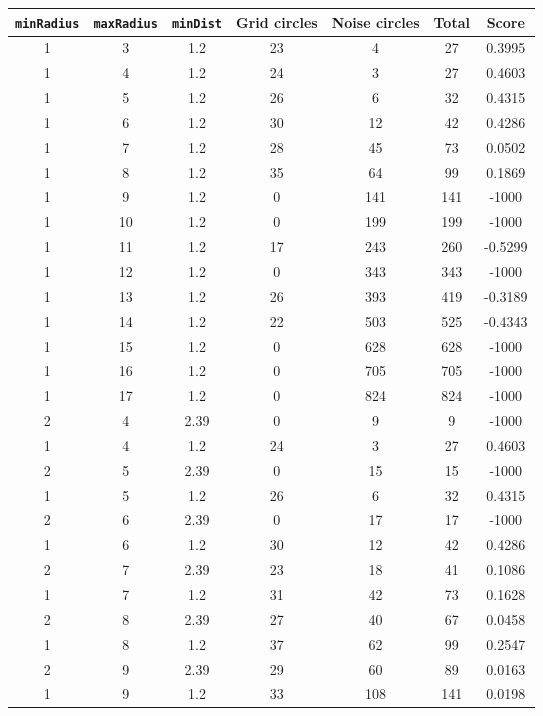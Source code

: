 \documentclass[letterpaper, 12pt]{article}
\begin{document}
\begin{longtable}{|c|c|c|c|c|c|c|}
\hline
\textbf{\texttt{minRadius}} & \textbf{\texttt{maxRadius}} & \textbf{\texttt{minDist}} & \textbf{Grid circles} & \textbf{Noise circles} & \textbf{Total} & \textbf{Score} \\
\hline
1 & 3 & 1.2 & 23 & 4 & 27 & 0.3995 \\
\hline
1 & 4 & 1.2 & 24 & 3 & 27 & 0.4603 \\
\hline
1 & 5 & 1.2 & 26 & 6 & 32 & 0.4315 \\
\hline
1 & 6 & 1.2 & 30 & 12 & 42 & 0.4286 \\
\hline
1 & 7 & 1.2 & 28 & 45 & 73 & 0.0502 \\
\hline
1 & 8 & 1.2 & 35 & 64 & 99 & 0.1869 \\
\hline
1 & 9 & 1.2 & 0 & 141 & 141 & -1000 \\
\hline
1 & 10 & 1.2 & 0 & 199 & 199 & -1000 \\
\hline
1 & 11 & 1.2 & 17 & 243 & 260 & -0.5299 \\
\hline
1 & 12 & 1.2 & 0 & 343 & 343 & -1000 \\
\hline
1 & 13 & 1.2 & 26 & 393 & 419 & -0.3189 \\
\hline
1 & 14 & 1.2 & 22 & 503 & 525 & -0.4343 \\
\hline
1 & 15 & 1.2 & 0 & 628 & 628 & -1000 \\
\hline
1 & 16 & 1.2 & 0 & 705 & 705 & -1000 \\
\hline
1 & 17 & 1.2 & 0 & 824 & 824 & -1000 \\
\hline
2 & 4 & 2.39 & 0 & 9 & 9 & -1000 \\
\hline
1 & 4 & 1.2 & 24 & 3 & 27 & 0.4603 \\
\hline
2 & 5 & 2.39 & 0 & 15 & 15 & -1000 \\
\hline
1 & 5 & 1.2 & 26 & 6 & 32 & 0.4315 \\
\hline
2 & 6 & 2.39 & 0 & 17 & 17 & -1000 \\
\hline
1 & 6 & 1.2 & 30 & 12 & 42 & 0.4286 \\
\hline
2 & 7 & 2.39 & 23 & 18 & 41 & 0.1086 \\
\hline
1 & 7 & 1.2 & 31 & 42 & 73 & 0.1628 \\
\hline
2 & 8 & 2.39 & 27 & 40 & 67 & 0.0458 \\
\hline
1 & 8 & 1.2 & 37 & 62 & 99 & 0.2547 \\
\hline
2 & 9 & 2.39 & 29 & 60 & 89 & 0.0163 \\
\hline
1 & 9 & 1.2 & 33 & 108 & 141 & 0.0198 \\

\end{longtable}
\end{document}
